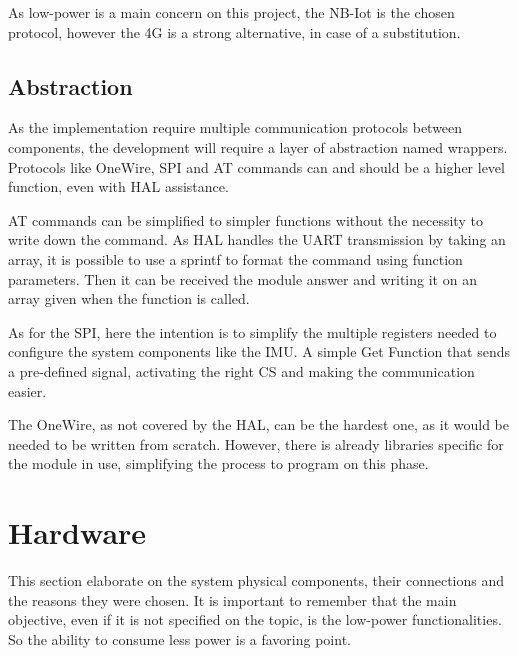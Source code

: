 As low-power is a main concern on this project, the NB-Iot is the chosen protocol, 
however the 4G is a strong alternative, in case of a substitution.
\subsection{Abstraction}

As the implementation require multiple communication protocols between components,
the development will require a layer of abstraction named wrappers. Protocols like OneWire, SPI and AT 
commands can and should be a higher level function, even with HAL assistance.

AT commands can be simplified to simpler functions without the necessity to write down
the command. As HAL handles the UART transmission by taking an array, it is possible to
use a sprintf to format the command using function parameters. Then it can be received 
the module answer and writing it on an array given when the function is called. 

As for the SPI, here the intention is to simplify the multiple registers needed to 
configure the system components like the IMU. A simple Get Function that sends a 
pre-defined signal, activating the right CS and making the communication easier.

The OneWire, as not covered by the HAL, can be the hardest one, as it would be needed
to be written from scratch. However, there is already libraries specific for the 
module in use, simplifying the process to program on this phase. 


\section{Hardware}

This section elaborate on the system physical components, their connections and the 
reasons they were chosen. It is important to remember that the main objective, even if 
it is not specified on the topic, is the low-power functionalities. So the ability to
consume less power is a favoring point. 


